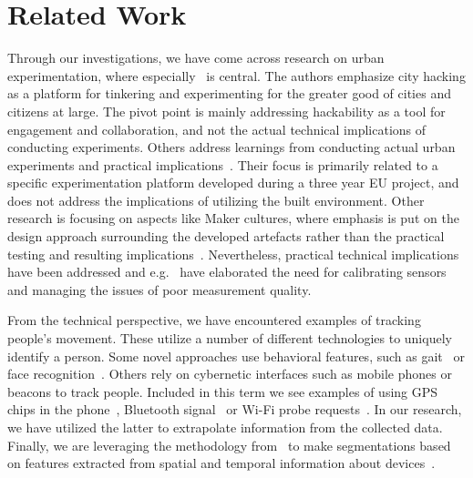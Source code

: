 \section{Related Work}

Through our investigations, we have come across research on urban experimentation, where especially~\cite{2019} is central. The authors emphasize city hacking as a platform for tinkering and experimenting for the greater good of cities and citizens at large. The pivot point is mainly addressing hackability as a tool for engagement and collaboration, and not the actual technical implications of conducting experiments. Others address learnings from conducting actual urban experiments and practical implications~\cite{Amaxilatis2018}. Their focus is primarily related to a specific experimentation platform developed during a three year EU project, and does not address the implications of utilizing the built environment. Other research is focusing on aspects like Maker cultures, where emphasis is put on the design approach surrounding the developed artefacts rather than the practical testing and resulting implications~\cite{9780071821131}. Nevertheless, practical technical implications have been addressed and e.g.~\cite{Longo:2017:CDC:3155100.3093895} have elaborated the need for calibrating sensors and managing the issues of poor measurement quality.

From the technical perspective, we have encountered examples of tracking people's movement. These utilize a number of different technologies to uniquely identify a person. Some novel approaches use behavioral features, such as gait~\cite{gait} or face recognition~\cite{face}. Others rely on cybernetic interfaces such as mobile phones or beacons to track people. Included in this term we see examples of using GPS chips in the phone~\cite{gps}, Bluetooth signal~\cite{bluetooth} or Wi-Fi probe requests~\cite{wifihubei,wifiuti,wifimonitor}.
In our research, we have utilized the latter to extrapolate information from the collected data. Finally, we are leveraging the methodology from~\cite{semantic} to make segmentations based on features extracted from spatial and temporal information about devices~\cite{largescalemonitoring, monitorflows}.